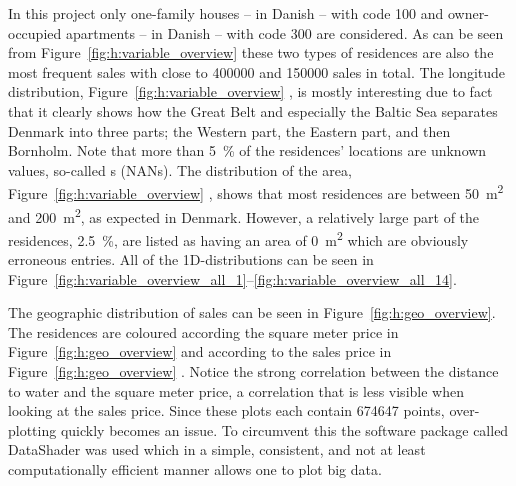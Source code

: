 In this project only one-family houses --  in Danish -- with code \num{100} and owner-occupied apartments --  in Danish -- with code \num{300} are considered. As can be seen from Figure~\ref{fig:h:variable_overview}  these two types of residences are also the most frequent sales with close to \num{400000} and \num{150000} sales in total. The longitude distribution, Figure~\ref{fig:h:variable_overview} , is mostly interesting due to fact that it clearly shows how the Great Belt and especially the Baltic Sea separates Denmark into three parts; the Western part, the Eastern part, and then Bornholm. Note that more than \SI{5}{\percent} of the residences' locations are unknown values, so-called s (NANs). The distribution of the area, Figure~\ref{fig:h:variable_overview} , shows that most residences are between \SI{50}{\meter^2} and \SI{200}{\meter^2}, as expected in Denmark. However, a relatively large part of the residences, \SI{2.5}{\percent}, are listed as having an area of \SI{0}{\meter^2} which are obviously erroneous entries. All of the 1D-distributions can be seen in Figure~\ref{fig:h:variable_overview_all_1}--\ref{fig:h:variable_overview_all_14}. 

The geographic distribution of sales can be seen in Figure~\ref{fig:h:geo_overview}. The residences are coloured according the square meter price in Figure~\ref{fig:h:geo_overview}  and according to the sales price in Figure~\ref{fig:h:geo_overview} . Notice the strong correlation between the distance to water and the square meter price, a correlation that is less visible when looking at the sales price. Since these plots each contain \num{674647} points, over-plotting quickly becomes an issue. To circumvent this the software package called DataShader \autocite{bednarDatashaderRevealingStructure2019} was used which in a simple, consistent, and not at least computationally efficient manner allows one to plot big data.

